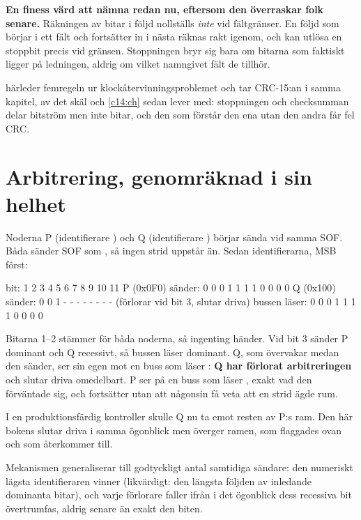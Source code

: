 \begin{warning}
\textbf{En finess värd att nämna redan nu, eftersom den överraskar folk senare.} Räkningen av bitar
i följd nollställs \emph{inte} vid fältgränser. En följd som börjar i ett fält och fortsätter in i
nästa räknas rakt igenom, och kan utlösa en stoppbit precis vid gränsen. Stoppningen bryr sig bara
om bitarna som faktiskt ligger på ledningen, aldrig om vilket namngivet fält de tillhör.
\end{warning}

 härleder femregeln ur klockåtervinningsproblemet och tar CRC-15:an i samma kapitel, av
det skäl  och \ref{c14:ch} sedan lever med: stoppningen och checksumman delar
bitström men inte bitar, och den som förstår den ena utan den andra får fel CRC.

\section{Arbitrering, genomräknad i sin helhet}
\label{c10:sec:arbitration}

Noderna P (identifierare ) och Q (identifierare ) börjar sända vid samma
SOF. Båda sänder SOF som , så ingen strid uppstår än. Sedan identifierarna, MSB först:

\begin{textdrawing}
             bit:  1  2  3  4  5  6  7  8  9 10 11
P (0x0F0) sänder:  0  0  0  1  1  1  1  0  0  0  0
Q (0x100) sänder:  0  0  1  -  -  -  -  -  -  -  -   (förlorar vid bit 3, slutar driva)
bussen läser:      0  0  0  1  1  1  1  0  0  0  0
\end{textdrawing}

Bitarna 1--2 stämmer för båda noderna, så ingenting händer. Vid bit 3 sänder P dominant och Q
recessivt, så bussen läser dominant. Q, som övervakar medan den sänder, ser sin egen  mot en
buss som läser : \textbf{Q har förlorat arbitreringen} och slutar driva omedelbart. P ser
 på en buss som läser , exakt vad den förväntade sig, och fortsätter utan att
någonsin få veta att en strid ägde rum.

I en produktionsfärdig kontroller skulle Q nu ta emot resten av P:s ram. Den här bokens
 slutar driva i samma ögonblick men överger ramen, som flaggades ovan och som
 återkommer till.

Mekanismen generaliserar till godtyckligt antal samtidiga sändare: den numeriskt lägsta
identifieraren vinner (likvärdigt: den längsta följden av inledande dominanta bitar), och varje
förlorare faller ifrån i det ögonblick dess recessiva bit övertrumfas, aldrig senare än exakt den
biten.

